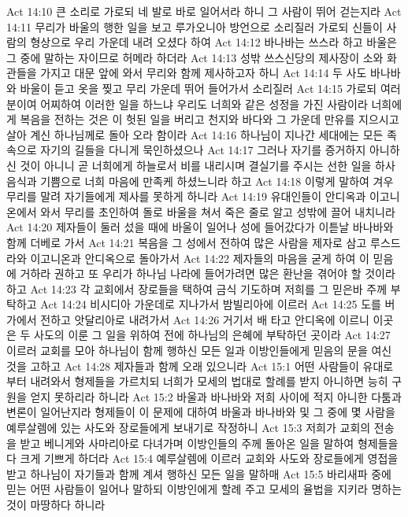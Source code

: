 Act 14:10  큰 소리로 가로되 네 발로 바로 일어서라 하니 그 사람이 뛰어 걷는지라
Act 14:11  무리가 바울의 행한 일을 보고 루가오니아 방언으로 소리질러 가로되 신들이 사람의 형상으로 우리 가운데 내려 오셨다 하여
Act 14:12  바나바는 쓰스라 하고 바울은 그 중에 말하는 자이므로 허메라 하더라
Act 14:13  성밖 쓰스신당의 제사장이 소와 화관들을 가지고 대문 앞에 와서 무리와 함께 제사하고자 하니
Act 14:14  두 사도 바나바와 바울이 듣고 옷을 찢고 무리 가운데 뛰어 들어가서 소리질러
Act 14:15  가로되 여러분이여 어찌하여 이러한 일을 하느냐 우리도 너희와 같은 성정을 가진 사람이라 너희에게 복음을 전하는 것은 이 헛된 일을 버리고 천지와 바다와 그 가운데 만유를 지으시고 살아 계신 하나님께로 돌아 오라 함이라
Act 14:16  하나님이 지나간 세대에는 모든 족속으로 자기의 길들을 다니게 묵인하셨으나
Act 14:17  그러나 자기를 증거하지 아니하신 것이 아니니 곧 너희에게 하늘로서 비를 내리시며 결실기를 주시는 선한 일을 하사 음식과 기쁨으로 너희 마음에 만족케 하셨느니라 하고
Act 14:18  이렇게 말하여 겨우 무리를 말려 자기들에게 제사를 못하게 하니라
Act 14:19  유대인들이 안디옥과 이고니온에서 와서 무리를 초인하여 돌로 바울을 쳐서 죽은 줄로 알고 성밖에 끌어 내치니라
Act 14:20  제자들이 둘러 섰을 때에 바울이 일어나 성에 들어갔다가 이튿날 바나바와 함께 더베로 가서
Act 14:21  복음을 그 성에서 전하여 많은 사람을 제자로 삼고 루스드라와 이고니온과 안디옥으로 돌아가서
Act 14:22  제자들의 마음을 굳게 하여 이 믿음에 거하라 권하고 또 우리가 하나님 나라에 들어가려면 많은 환난을 겪어야 할 것이라 하고
Act 14:23  각 교회에서 장로들을 택하여 금식 기도하며 저희를 그 믿은바 주께 부탁하고
Act 14:24  비시디아 가운데로 지나가서 밤빌리아에 이르러
Act 14:25  도를 버가에서 전하고 앗달리아로 내려가서
Act 14:26  거기서 배 타고 안디옥에 이르니 이곳은 두 사도의 이룬 그 일을 위하여 전에 하나님의 은혜에 부탁하던 곳이라
Act 14:27  이르러 교회를 모아 하나님이 함께 행하신 모든 일과 이방인들에게 믿음의 문을 여신 것을 고하고
Act 14:28  제자들과 함께 오래 있으니라
Act 15:1  어떤 사람들이 유대로부터 내려와서 형제들을 가르치되 너희가 모세의 법대로 할례를 받지 아니하면 능히 구원을 얻지 못하리라 하니라
Act 15:2  바울과 바나바와 저희 사이에 적지 아니한 다툼과 변론이 일어난지라 형제들이 이 문제에 대하여 바울과 바나바와 및 그 중에 몇 사람을 예루살렘에 있는 사도와 장로들에게 보내기로 작정하니
Act 15:3  저희가 교회의 전송을 받고 베니게와 사마리아로 다녀가며 이방인들의 주께 돌아온 일을 말하여 형제들을 다 크게 기쁘게 하더라
Act 15:4  예루살렘에 이르러 교회와 사도와 장로들에게 영접을 받고 하나님이 자기들과 함께 계셔 행하신 모든 일을 말하매
Act 15:5  바리새파 중에 믿는 어떤 사람들이 일어나 말하되 이방인에게 할례 주고 모세의 율법을 지키라 명하는 것이 마땅하다 하니라
